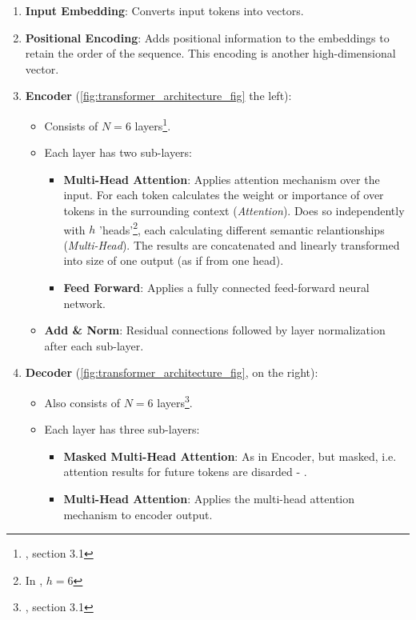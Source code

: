 \begin{enumerate}
	\item \textbf{Input Embedding}: Converts input tokens into vectors.
	\item \textbf{Positional Encoding}: Adds positional information to the embeddings to retain the order of the sequence. This encoding is another high-dimensional vector.
	\item \textbf{Encoder} (\autoref{fig:transformer_architecture_fig} the left):
	      \begin{itemize}
		      \item Consists of \(N = 6\) layers\footnote{\cite{attention_is_all_you_need}, section 3.1}.
		      \item Each layer has two sub-layers:
		            \begin{itemize}
			            \item \textbf{Multi-Head Attention}: Applies attention mechanism over the input. For each token calculates the weight or importance of over tokens in the surrounding context (\textit{Attention}). Does so independently with \(h\) 'heads'\footnote{In \cite{attention_is_all_you_need}, \(h = 6\)}, each calculating different semantic relantionships (\textit{Multi-Head}). The results are concatenated and linearly transformed into size of one output (as if from one head).
			            \item \textbf{Feed Forward}: Applies a fully connected feed-forward neural network.
		            \end{itemize}
		      \item \textbf{Add \& Norm}: Residual connections followed by layer normalization after each sub-layer.
	      \end{itemize}
	\item \textbf{Decoder} (\autoref{fig:transformer_architecture_fig}, on the right):
	      \begin{itemize}
		      \item Also consists of \(N = 6\) layers\footnote{\cite{attention_is_all_you_need}, section 3.1}.
		      \item Each layer has three sub-layers:
		            \begin{itemize}
			            \item \textbf{Masked Multi-Head Attention}: As in Encoder, but masked, i.e. attention results for future tokens are disarded - .
			            \item \textbf{Multi-Head Attention}: Applies the multi-head attention mechanism to encoder output.

\end{itemize}
\end{itemize}
\end{enumerate}
